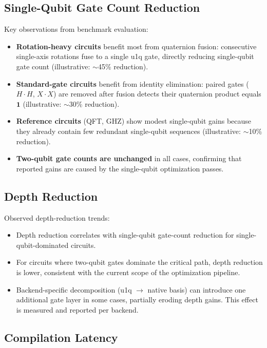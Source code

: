 \documentclass[conference]{IEEEtran}
\begin{document}
\subsection{Single-Qubit Gate Count Reduction}

Key observations from benchmark evaluation:

\begin{itemize}
\item \textbf{Rotation-heavy circuits} benefit most from quaternion fusion: consecutive
single-axis rotations fuse to a single u1q gate, directly reducing single-qubit gate count
(illustrative: $\sim$45\% reduction).
\item \textbf{Standard-gate circuits} benefit from identity elimination: paired gates
($H{\cdot}H$, $X{\cdot}X$) are removed after fusion detects their quaternion product equals
$\mathbf{1}$ (illustrative: $\sim$30\% reduction).
\item \textbf{Reference circuits} (QFT, GHZ) show modest single-qubit gains because they
already contain few redundant single-qubit sequences (illustrative: $\sim$10\% reduction).
\item \textbf{Two-qubit gate counts are unchanged} in all cases, confirming that reported
gains are caused by the single-qubit optimization passes.
\end{itemize}

\subsection{Depth Reduction}

Observed depth-reduction trends:

\begin{itemize}
\item Depth reduction correlates with single-qubit gate-count reduction for
single-qubit-dominated circuits.
\item For circuits where two-qubit gates dominate the critical path, depth reduction is lower,
consistent with the current scope of the optimization pipeline.
\item Backend-specific decomposition (u1q $\to$ native basis) can introduce one additional
gate layer in some cases, partially eroding depth gains. This effect is measured and reported
per backend.
\end{itemize}

\subsection{Compilation Latency}
\end{document}

